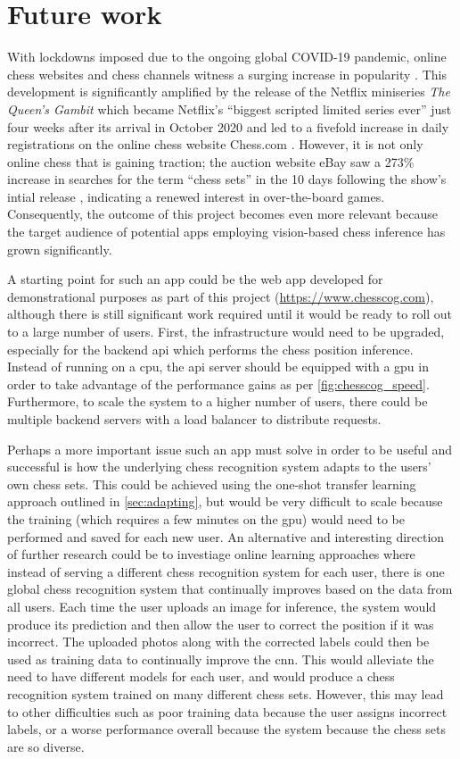 \documentclass[../main.tex]{subfiles}
\begin{document}
\section{Future work}
With lockdowns imposed due to the ongoing global COVID-19 pandemic, online chess websites and chess channels witness a surging increase in popularity \cite{dottle2020}.
This development is significantly amplified by the release of the Netflix miniseries \textit{The Queen's Gambit} which became Netflix's ``biggest scripted limited series ever'' \cite{friedlander2020} just four weeks after its arrival in October 2020 and led to a fivefold increase in daily registrations on the online chess website Chess.com \cite{dottle2020}.
However, it is not only online chess that is gaining traction; the auction website eBay saw a 273\% increase in searches for the term ``chess sets'' in the 10 days following the show's intial release \cite{young2020}, indicating a renewed interest in over-the-board games.
Consequently, the outcome of this project becomes even more relevant because the target audience of potential apps employing vision-based chess inference has grown significantly.

A starting point for such an app could be the web app developed for demonstrational purposes as part of this project (\url{https://www.chesscog.com}), although there is still significant work required until it would be ready to roll out to a large number of users.
First, the infrastructure would need to be upgraded, especially for the backend \gls{api} which performs the chess position inference.
Instead of running on a \gls{cpu}, the \gls{api} server should be equipped with a \gls{gpu} in order to take advantage of the performance gains as per \cref{fig:chesscog_speed}.
Furthermore, to scale the system to a higher number of users, there could be multiple backend servers with a load balancer to distribute requests.

Perhaps a more important issue such an app must solve in order to be useful and successful is how the underlying chess recognition system adapts to the users' own chess sets.
This could be achieved using the one-shot transfer learning approach outlined in \cref{sec:adapting}, but would be very difficult to scale because the training (which requires a few minutes on the \gls{gpu}) would need to be performed and saved for each new user.
An alternative and interesting direction of further research could be to investiage online learning approaches where instead of serving a different chess recognition system for each user, there is one global chess recognition system that continually improves based on the data from all users.
Each time the user uploads an image for inference, the system would produce its prediction and then allow the user to correct the position if it was incorrect.
The uploaded photos along with the corrected labels could then be used as training data to continually improve the \gls{cnn}.
This would alleviate the need to have different models for each user, and would produce a chess recognition system trained on many different chess sets.
However, this may lead to other difficulties such as poor training data because the user assigns incorrect labels, or a worse performance overall because the system because the chess sets are so diverse.
\end{document}
